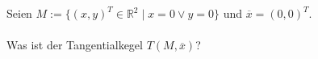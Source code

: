 
Seien $M:=\{(x,y)^T\in\mathbb R^2\mid x=0\lor y=0\}$ und $\overline x=(0,0)^T$.\\\\
Was ist der Tangentialkegel $T(M,\overline x)$?